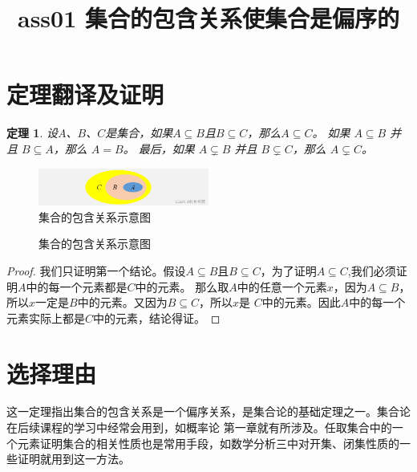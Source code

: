 \documentclass{article}
\title{ass01 集合的包含关系使集合是偏序的}
\date{}
\author{}
\newtheorem{theorem}{定理}
\begin{document}
\maketitle

\section{定理翻译及证明}

\begin{theorem}
    设\(A\)、\(B\)、\(C\)是集合，如果\(A \subseteq B\)且\(B \subseteq C\)，那么\(A \subseteq C \)。
    如果 \(A \subseteq B\) 并且 \(B \subseteq A\)，那么 \(A = B\)。
    最后，如果 \(A \subsetneq B\) 并且 \(B \subsetneq C\)，那么 \(A \subsetneq C\)。\cite[p.32]{Tao2016AnalysisI}
\end{theorem}

\begin{figure}[h] 
    \centering 
    \includegraphics[width=0.5\textwidth]{setinclusion.png}
    \caption{集合的包含关系示意图}
    \label{fig:example1}
\end{figure}

\begin{figure}[h]
    \centering
    \caption{集合的包含关系示意图}
    \label{fig:example2}
\end{figure}

\begin{proof}
    我们只证明第一个结论。假设\(A \subseteq B\)且\(B \subseteq C\)，为了证明\( A \subseteq C\),我们必须证明\(A\)中的每一个元素都是\(C\)中的元素。
    那么取\(A\)中的任意一个元素\(x\)，因为\(A \subseteq B\)，所以\(x\)一定是\(B\)中的元素。又因为\(B \subseteq C\)，所以\(x\)是
    \(C\)中的元素。因此\(A\)中的每一个元素实际上都是\(C\)中的元素，结论得证。
\end{proof}

\section{选择理由}
    这一定理指出集合的包含关系是一个偏序关系，是集合论的基础定理之一。集合论在后续课程的学习中经常会用到，如概率论
    第一章就有所涉及。任取集合中的一个元素证明集合的相关性质也是常用手段，如数学分析三中对开集、闭集性质的一些证明就用到这一方法。



\end{document}
